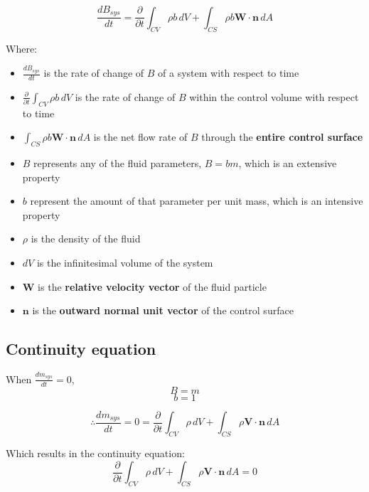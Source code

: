\documentclass[11pt]{article}
\begin{document}
\[\frac{dB_{sys}}{dt} = \frac{\partial}{\partial t} \int_{CV} \rho b \, dV + \int_{CS} \rho b \boldsymbol{W} \cdot \boldsymbol{n} \, dA\]

Where:
\begin{itemize}
\item \(\frac{dB_{sys}}{dt}\) is the rate of change of \(B\) of a system with respect to time
\item \(\frac{\partial}{\partial t} \int_{CV} \rho b \, dV\) is the rate of change of \(B\) within the control volume with respect to time
\item \(\int_{CS} \rho b \boldsymbol{W} \cdot \boldsymbol{n} \, dA\) is the net flow rate of \(B\) through the \textbf{entire control surface}
\item \(B\) represents any of the fluid parameters, \(B = bm\), which is an extensive property
\item \(b\) represent the amount of that parameter per unit mass, which is an intensive property
\item \(\rho\) is the density of the fluid
\item \(dV\) is the infinitesimal volume of the system
\item \(\boldsymbol{W}\) is the \textbf{relative velocity vector} of the fluid particle
\item \(\boldsymbol{n}\) is the \textbf{outward normal unit vector} of the control surface
\end{itemize}

\newpage

\subsection{Continuity equation}
\label{sec:org45094ac}
When \(\frac{dm_{sys}}{dt} = 0\),
\[B = m\]
\[b = 1\]

\[\therefore \frac{dm_{sys}}{dt} = 0 = \frac{\partial}{\partial t} \int_{CV} \rho \, dV + \int_{CS} \rho \boldsymbol{V} \cdot \boldsymbol{n} \, dA\]

Which results in the continuity equation:
\[\frac{\partial}{\partial t} \int_{CV} \rho \, dV + \int_{CS} \rho \boldsymbol{V} \cdot \boldsymbol{n} \, dA = 0\]
\end{document}
